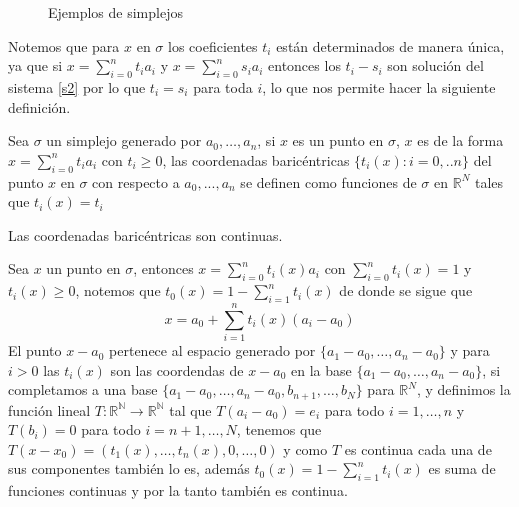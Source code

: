 \begin{figure}[h]
\centering
{}
\caption{Ejemplos de simplejos}
\end{figure}

Notemos que para $x$ en $\sigma$ los coeficientes $t_i$ están determinados de manera única, ya que si $x = \sum_{i=0}^{n}t_ia_i$ y $x = \sum_{i=0}^{n}s_ia_i$ entonces los $t_i-s_i$ son solución del sistema \ref{s2} por lo que $t_i=s_i$ para toda $i$, lo que nos permite hacer la 
siguiente definición.
\begin{Defi}
Sea $\sigma$ un simplejo generado por $a_0,\ldots,a_n$, si $x$ es un punto en $\sigma$, $x$ es de la forma $x = \sum_{i=0}^{n}t_ia_i$ con $t_i\geqslant 0$, las coordenadas baricéntricas $\{t_i(x):i = 0,..n\}$ del punto $x$ en $\sigma$ con respecto a $a_0,...,a_n$ se definen como funciones de $\sigma$ en $\mathbb{R}^{N}$ tales que $t_i(x) = t_i$
\end{Defi}
\begin{Prop}
Las coordenadas baricéntricas son continuas.
\end{Prop}
\begin{Dem}

Sea $x$ un punto en $\sigma$, entonces $x=\sum_{i=0}^{n}t_i(x)a_i$ con $\sum_{i=0}^{n}t_i(x)=1$ y 
$t_i(x)\geq 0$, notemos que $t_0(x) = 1-\sum_{i=1}^{n}t_i(x)$ de donde se sigue que 
\begin{equation}
 x = a_0 + \sum_{i=1}^{n}t_i(x)(a_i-a_0)
\end{equation}
El punto $x-a_0$ pertenece al espacio generado por $\{a_1-a_0,\ldots,a_n-a_0\}$ y para $i>0$ las $t_i(x)$  son las coordendas de $x-a_0$ en la base $\{a_1-a_0,\ldots,a_n-a_0\}$, si completamos a una base $\{a_1-a_0,\ldots,a_n-a_0,b_{n+1},\ldots,b_N\}$ para $\mathbb{R}^N$,  y definimos la función lineal $T\colon \mathbb{R^N}\rightarrow \mathbb{R^N}$ tal que $T(a_i-a_0) = e_i$ para todo $i=1,\ldots,n$ y $T(b_i) = 0$ para todo $i = n+1,\ldots,N$, tenemos que $T(x-x_0) = (t_1(x),\ldots,t_n(x),0,\ldots,0)$ y como $T$ es continua cada una de sus componentes también lo es, además $t_0(x) = 1-\sum_{i=1}^{n}t_i(x)$ es suma de funciones continuas y por la tanto también es continua. 
\end{Dem}
